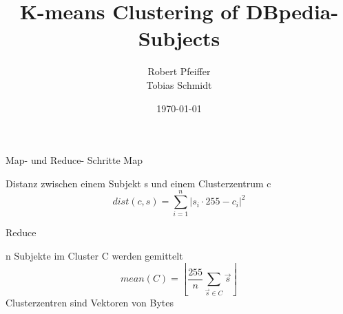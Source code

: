 \documentclass[xelatex]{beamer}
\title{K-means Clustering of DBpedia-Subjects}
\author[Robert Pfeiffer and Tobias Schmidt] {Robert Pfeiffer\\Tobias Schmidt}
\date{\today}
\begin{document}


\begin{frame}{Map- und Reduce- Schritte}
  Map

  Distanz zwischen einem Subjekt s und einem Clusterzentrum c
  $$ dist(c,s) = \sum_{i=1}^{n} | s_i \cdot 255 - c_i |^2 $$
  
  \pause
  Reduce
  
  n Subjekte im Cluster C werden gemittelt
  $$ mean(C) = \left\lfloor \frac{255}{n} \sum_{\vec s \in C}  \vec s \right\rfloor $$
  \pause
  Clusterzentren sind Vektoren von Bytes
  
\end{frame}
\end{document}
